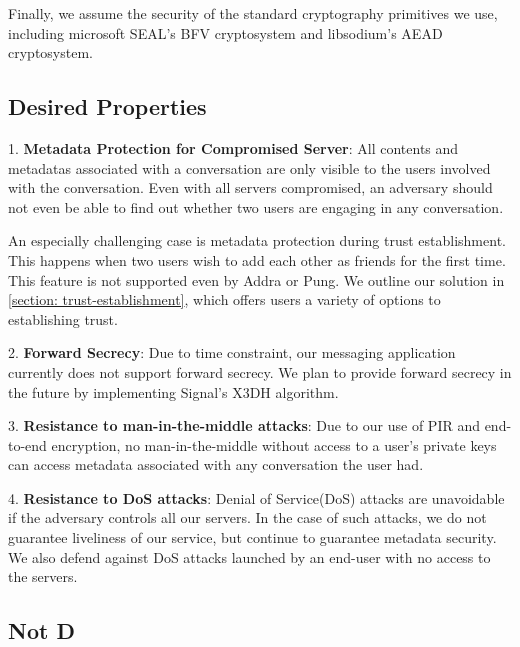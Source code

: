 Finally, we assume the security of the standard cryptography primitives we use, including microsoft SEAL's BFV cryptosystem and libsodium's AEAD cryptosystem. 

\subsection{Desired Properties}

1. \textbf{Metadata Protection for Compromised Server}: All contents and metadatas associated with a conversation are only visible to the users involved with the conversation. Even with all servers compromised, an adversary should not even be able to find out whether two users are engaging in any conversation.

An especially challenging case is metadata protection during trust establishment. This happens when two users wish to add each other as friends for the first time. This feature is not supported even by Addra or Pung. We outline our solution in \cref{section: trust-establishment}, which offers users a variety of options to establishing trust.

2. \textbf{Forward Secrecy}: Due to time constraint, our messaging application currently does not support forward secrecy. We plan to provide forward secrecy in the future by implementing Signal's X3DH algorithm.

3. \textbf{Resistance to man-in-the-middle attacks}: Due to our use of PIR and end-to-end encryption, no man-in-the-middle without access to a user's private keys can access metadata associated with any conversation the user had.

4. \textbf{Resistance to DoS attacks}: Denial of Service(DoS) attacks are unavoidable if the adversary controls all our servers. In the case of such attacks, we do not guarantee liveliness of our service, but continue to guarantee metadata security. We also defend against DoS attacks launched by an end-user with no access to the servers.

\subsection{Not D }



